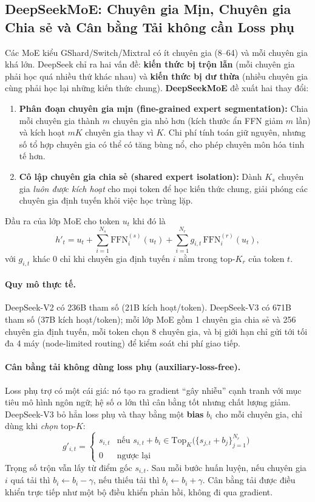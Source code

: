 \subsection{DeepSeekMoE: Chuyên gia Mịn, Chuyên gia Chia sẻ và Cân bằng Tải không cần Loss phụ \newtag}
\label{ssec:deepseekmoe}
Các MoE kiểu GShard/Switch/Mixtral có ít chuyên gia (8--64) và mỗi chuyên gia khá lớn. DeepSeek chỉ ra hai vấn đề: \textbf{kiến thức bị trộn lẫn} (mỗi chuyên gia phải học quá nhiều thứ khác nhau) và \textbf{kiến thức bị dư thừa} (nhiều chuyên gia cùng phải học lại những kiến thức chung). \textbf{DeepSeekMoE} \cite{dai2024deepseekmoe} đề xuất hai thay đổi:
\begin{enumerate}
	\item \textbf{Phân đoạn chuyên gia mịn (fine-grained expert segmentation):} Chia mỗi chuyên gia thành $m$ chuyên gia nhỏ hơn (kích thước ẩn FFN giảm $m$ lần) và kích hoạt $mK$ chuyên gia thay vì $K$. Chi phí tính toán giữ nguyên, nhưng số tổ hợp chuyên gia có thể có tăng bùng nổ, cho phép chuyên môn hóa tinh tế hơn.
	\item \textbf{Cô lập chuyên gia chia sẻ (shared expert isolation):} Dành $K_s$ chuyên gia \emph{luôn được kích hoạt} cho mọi token để học kiến thức chung, giải phóng các chuyên gia định tuyến khỏi việc học trùng lặp.
\end{enumerate}
Đầu ra của lớp MoE cho token $u_t$ khi đó là
\[
h'_t = u_t + \sum_{i=1}^{N_s} \text{FFN}^{(s)}_i(u_t) + \sum_{i=1}^{N_r} g_{i,t}\,\text{FFN}^{(r)}_i(u_t),
\]
với $g_{i,t}$ khác 0 chỉ khi chuyên gia định tuyến $i$ nằm trong top-$K_r$ của token $t$.

\paragraph{Quy mô thực tế.} DeepSeek-V2 \cite{deepseekai2024v2} có 236B tham số (21B kích hoạt/token). DeepSeek-V3 \cite{deepseekai2024v3} có 671B tham số (37B kích hoạt/token); mỗi lớp MoE gồm 1 chuyên gia chia sẻ và 256 chuyên gia định tuyến, mỗi token chọn 8 chuyên gia, và bị giới hạn chỉ gửi tới tối đa 4 máy (node-limited routing) để kiểm soát chi phí giao tiếp.

\paragraph{Cân bằng tải không dùng loss phụ (auxiliary-loss-free).} Loss phụ trợ có một cái giá: nó tạo ra gradient “gây nhiễu” cạnh tranh với mục tiêu mô hình ngôn ngữ; hệ số $\alpha$ lớn thì cân bằng tốt nhưng chất lượng giảm. DeepSeek-V3 \cite{wang2024auxlossfree, deepseekai2024v3} bỏ hẳn loss phụ và thay bằng một \textbf{bias} $b_i$ cho mỗi chuyên gia, chỉ dùng khi \emph{chọn} top-$K$:
\[
g'_{i,t} = \begin{cases} s_{i,t} & \text{nếu } s_{i,t} + b_i \in \text{Top}_K\big(\{s_{j,t} + b_j\}_{j=1}^{N_r}\big) \\ 0 & \text{ngược lại}\end{cases}
\]
Trọng số trộn vẫn lấy từ điểm gốc $s_{i,t}$. Sau mỗi bước huấn luyện, nếu chuyên gia $i$ quá tải thì $b_i \leftarrow b_i - \gamma$, nếu thiếu tải thì $b_i \leftarrow b_i + \gamma$. Cân bằng tải được điều khiển trực tiếp như một bộ điều khiển phản hồi, không đi qua gradient.

